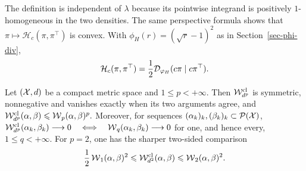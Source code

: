 The definition is independent of $\lambda$ because its pointwise integrand is positively $1$-homogeneous in the two densities. The same perspective formula shows that $\pi\mapsto\mathscr H_c(\pi,\pi^\top)$ is convex. With $\phi_H(r)=(\sqrt r-1)^2$ as in Section~\ref{sec-phi-div},
\begin{equation}\label{eq-classical-square-root-weighted-hellinger}
\mathcal H_c(\pi,\pi^\top)
=\frac12\mathcal{D}_{\varphi_H}(c\pi\mid c\pi^\top).
\end{equation}
\begin{prop}\label{prop-classical-square-root-wasserstein-comparison}
Let $(\mathcal{X},d)$ be a compact metric space and $1\leq p<+\infty$. Then $\mathcal W_{d^p}^{\mathrm{cl}}$ is symmetric, nonnegative and vanishes exactly when its two arguments agree, and
\(\mathcal W_{d^p}^{\mathrm{cl}}(\alpha,\beta) \leqslant \operatorname{\mathcal{W}}_p(\alpha,\beta)^p.\)
Moreover, for sequences $(\alpha_k)_k,(\beta_k)_k\subset\mathcal{P}(\mathcal{X})$, \(\mathcal W_{d^p}^{\mathrm{cl}}(\alpha_k,\beta_k)\longrightarrow0 \quad\Longleftrightarrow\quad \operatorname{\mathcal{W}}_q(\alpha_k,\beta_k)\longrightarrow0\)
for one, and hence every, $1\leq q<+\infty$. For $p=2$, one has the sharper two-sided comparison
\begin{equation}\label{eq-classical-square-root-wasserstein-bounds}
\frac12\operatorname{\mathcal{W}}_1(\alpha,\beta)^2
\leqslant
\mathcal W_{d^2}^{\mathrm{cl}}(\alpha,\beta)
\leqslant
\operatorname{\mathcal{W}}_2(\alpha,\beta)^2.
\end{equation}
\end{prop}
